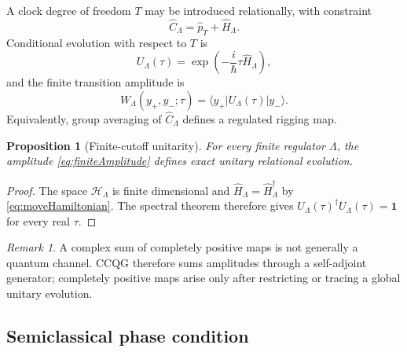 \documentclass[11pt]{article}
\newtheorem{proposition}[definition]{Proposition}
\theoremstyle{remark}
\newtheorem{remark}[definition]{Remark}
\newcommand{\cH}{\mathcal H}
\newcommand{\id}{\mathbf 1}
\begin{document}
A clock degree of freedom \(T\) may be introduced relationally, with
constraint
\begin{equation}
  \widehat C_\Lambda
  =
  \widehat p_T+\widehat H_\Lambda.
\end{equation}
Conditional evolution with respect to \(T\) is
\begin{equation}
  U_\Lambda(\tau)
  =\exp\left(-\frac{i}{\hbar}\tau\widehat H_\Lambda\right),
\end{equation}
and the finite transition amplitude is
\begin{equation}
  W_\Lambda(y_+,y_-;\tau)
  =
  \langle y_+|U_\Lambda(\tau)|y_-\rangle.
  \label{eq:finiteAmplitude}
\end{equation}
Equivalently, group averaging of \(\widehat C_\Lambda\) defines a
regulated rigging map.

\begin{proposition}[Finite-cutoff unitarity]
For every finite regulator \(\Lambda\), the amplitude
\eqref{eq:finiteAmplitude} defines exact unitary relational evolution.
\end{proposition}

\begin{proof}
The space \(\cH_\Lambda\) is finite dimensional and
\(\widehat H_\Lambda=\widehat H_\Lambda^\dagger\) by
\eqref{eq:moveHamiltonian}.  The spectral theorem therefore gives
\(U_\Lambda(\tau)^\dagger U_\Lambda(\tau)=\id\) for every real \(\tau\).
\end{proof}

\begin{remark}
A complex sum of completely positive maps is not generally a quantum
channel.  CCQG therefore sums amplitudes through a self-adjoint generator;
completely positive maps arise only after restricting or tracing a global
unitary evolution.
\end{remark}

\subsection{Semiclassical phase condition}
\end{document}
